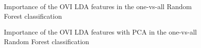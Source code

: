 \documentclass[twoside]{article}
\begin{document}
\begin{multicols}{2}
\begin{figure}[H]
{}
%
\caption{Importance of the OVI LDA features in the one-vs-all Random Forest classification}
\label{fig:figure}
\end{figure}

\begin{figure}[H]
\centering
{}
\quad
{}
\quad
{}
%
\caption{Importance of the OVI LDA features with PCA in the one-vs-all Random Forest classification}
\label{fig:figure}
\end{figure}


\end{multicols}
\end{document}
